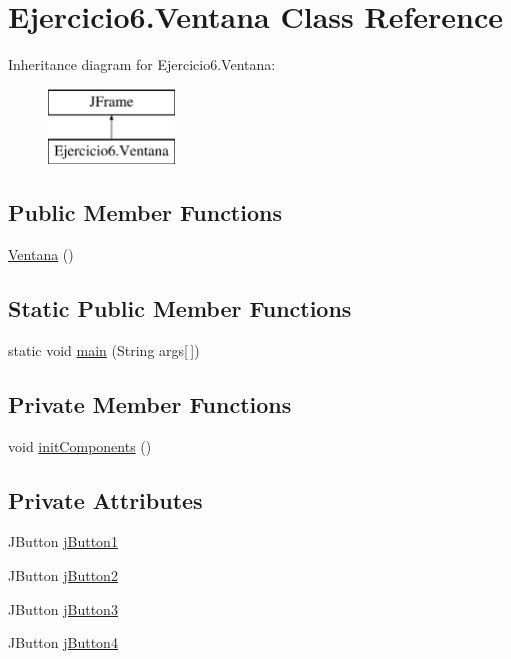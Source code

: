 \hypertarget{class_ejercicio6_1_1_ventana}{}\section{Ejercicio6.\+Ventana Class Reference}
\label{class_ejercicio6_1_1_ventana}
Inheritance diagram for Ejercicio6.\+Ventana\+:\begin{figure}[H]
\begin{center}
\leavevmode
\includegraphics[height=2.000000cm]{class_ejercicio6_1_1_ventana}
\end{center}
\end{figure}
\subsection*{Public Member Functions}
\begin{DoxyCompactItemize}
\item 
\mbox{\hyperlink{class_ejercicio6_1_1_ventana_ae3dbf01a448d02dcc9a5b858e902ca23}{Ventana}} ()
\end{DoxyCompactItemize}
\subsection*{Static Public Member Functions}
\begin{DoxyCompactItemize}
\item 
static void \mbox{\hyperlink{class_ejercicio6_1_1_ventana_ad8b396e48f768f227d519aa72bae8057}{main}} (String args\mbox{[}$\,$\mbox{]})
\end{DoxyCompactItemize}
\subsection*{Private Member Functions}
\begin{DoxyCompactItemize}
\item 
void \mbox{\hyperlink{class_ejercicio6_1_1_ventana_a0e149e1c8087dce9a724c6e8e4b8ca7d}{init\+Components}} ()
\end{DoxyCompactItemize}
\subsection*{Private Attributes}
\begin{DoxyCompactItemize}
\item 
J\+Button \mbox{\hyperlink{class_ejercicio6_1_1_ventana_ad44d1eb3a44301c300133e494094fa82}{j\+Button1}}
\item 
J\+Button \mbox{\hyperlink{class_ejercicio6_1_1_ventana_a2ed2a64625ce0750faff659b6877db2a}{j\+Button2}}
\item 
J\+Button \mbox{\hyperlink{class_ejercicio6_1_1_ventana_a5e56d7fdd53c855b57547c618c29838a}{j\+Button3}}
\item 
J\+Button \mbox{\hyperlink{class_ejercicio6_1_1_ventana_a2ec5afa2ee7fdb55cebb1e2809f4a662}{j\+Button4}}
\end{DoxyCompactItemize}


